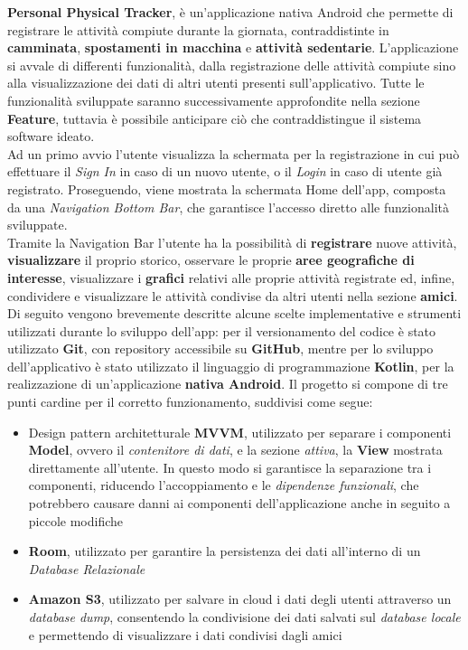 \documentclass{article}
\begin{document}
\textbf{Personal Physical Tracker}, è un'applicazione nativa Android che permette di registrare le attività compiute durante la giornata, contraddistinte in \textbf{camminata}, \textbf{spostamenti in macchina} e \textbf{attività sedentarie}.
L'applicazione si avvale di differenti funzionalità, dalla registrazione delle attività compiute sino alla visualizzazione dei dati di altri utenti presenti sull'applicativo. Tutte le funzionalità sviluppate saranno successivamente approfondite nella sezione \textbf{Feature}, tuttavia è possibile anticipare ciò che contraddistingue il sistema software ideato. \vspace*{7pt}\\
Ad un primo avvio l'utente visualizza la schermata per la registrazione in cui può effettuare il \textit{Sign In} in caso di un nuovo utente, o il \textit{Login} in caso di utente già registrato. Proseguendo, viene mostrata la schermata Home dell'app, composta da una \textit{Navigation Bottom Bar}, che garantisce l'accesso diretto alle funzionalità sviluppate. \\
Tramite la Navigation Bar l'utente ha la possibilità di \textbf{registrare} nuove attività, \textbf{visualizzare} il proprio storico, osservare le proprie \textbf{aree geografiche di interesse}, visualizzare i \textbf{grafici} relativi alle proprie attività registrate ed, infine, condividere e visualizzare le attività condivise da altri utenti nella sezione \textbf{amici}. \vspace*{7pt}\\
Di seguito vengono brevemente descritte alcune scelte implementative e strumenti utilizzati durante lo sviluppo dell'app: per il versionamento del codice è stato utilizzato \textbf{Git}, con repository accessibile su \textbf{GitHub}, mentre per lo sviluppo dell'applicativo è stato utilizzato il linguaggio di programmazione \textbf{Kotlin}, per la realizzazione di un'applicazione \textbf{nativa Android}. Il progetto si compone di tre punti cardine per il corretto funzionamento, suddivisi come segue:
\begin{itemize}
    \renewcommand{\labelitemi}{-}
    \item Design pattern architetturale \textbf{MVVM}, utilizzato per separare i componenti \textbf{Model}, ovvero il \textit{contenitore di dati}, e la sezione \textit{attiva}, la \textbf{View} mostrata direttamente all'utente. In questo modo si garantisce la separazione tra i componenti, riducendo l'accoppiamento e le \textit{dipendenze funzionali}, che potrebbero causare danni ai componenti dell'applicazione anche in seguito a piccole modifiche
    \item \textbf{Room}, utilizzato per garantire la persistenza dei dati all'interno di un \textit{Database Relazionale}
    \item \textbf{Amazon S3}, utilizzato per salvare in cloud i dati degli utenti attraverso un \textit{database dump}, consentendo la condivisione dei dati salvati sul \textit{database locale} e permettendo di visualizzare i dati condivisi dagli amici
\end{itemize}
\end{document}
